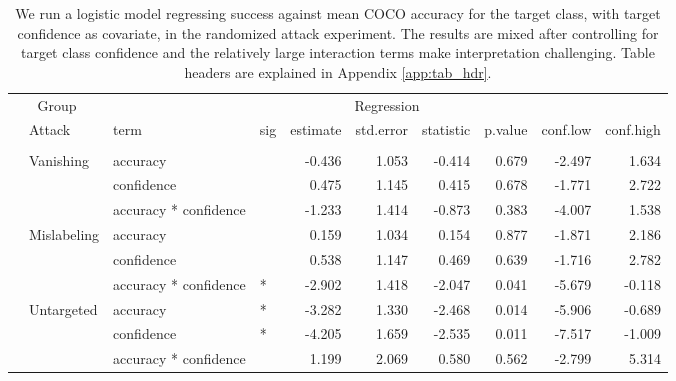 \begin{longtable}[t]{llllrrrrrr}
\caption{\label{tab:target_success_table}We run a logistic model regressing success against mean COCO accuracy for the target class, with target confidence as covariate, in the randomized attack experiment. The results are mixed after controlling for target class confidence and the relatively large interaction terms make interpretation challenging. Table headers are explained in Appendix \ref{app:tab_hdr}.}\\
\toprule
\multicolumn{2}{c}{Group} & \multicolumn{8}{c}{Regression} \\
\cmidrule(l{3pt}r{3pt}){1-2} \cmidrule(l{3pt}r{3pt}){3-10}
 & Attack & term & sig & estimate & std.error & statistic & p.value & conf.low & conf.high\\
\midrule
\addlinespace[0.3em]
\multicolumn{10}{l}{\textbf{YOLOv3}}\\
\hspace{1em} & Vanishing & accuracy &  & -0.436 & 1.053 & -0.414 & 0.679 & -2.497 & 1.634\\
\cmidrule{3-10}\nopagebreak
\hspace{1em} &  & confidence &  & 0.475 & 1.145 & 0.415 & 0.678 & -1.771 & 2.722\\
\cmidrule{3-10}\nopagebreak
\hspace{1em} &  & accuracy * confidence &  & -1.233 & 1.414 & -0.873 & 0.383 & -4.007 & 1.538\\
\cmidrule{2-10}\nopagebreak
\hspace{1em} & Mislabeling & accuracy &  & 0.159 & 1.034 & 0.154 & 0.877 & -1.871 & 2.186\\
\cmidrule{3-10}\nopagebreak
\hspace{1em} &  & confidence &  & 0.538 & 1.147 & 0.469 & 0.639 & -1.716 & 2.782\\
\cmidrule{3-10}\nopagebreak
\hspace{1em} &  & accuracy * confidence & * & -2.902 & 1.418 & -2.047 & 0.041 & -5.679 & -0.118\\
\cmidrule{2-10}\nopagebreak
\hspace{1em} & Untargeted & accuracy & * & -3.282 & 1.330 & -2.468 & 0.014 & -5.906 & -0.689\\
\cmidrule{3-10}\nopagebreak
\hspace{1em} &  & confidence & * & -4.205 & 1.659 & -2.535 & 0.011 & -7.517 & -1.009\\
\cmidrule{3-10}\nopagebreak
\hspace{1em} &  & accuracy * confidence &  & 1.199 & 2.069 & 0.580 & 0.562 & -2.799 & 5.314\\

\end{longtable}
